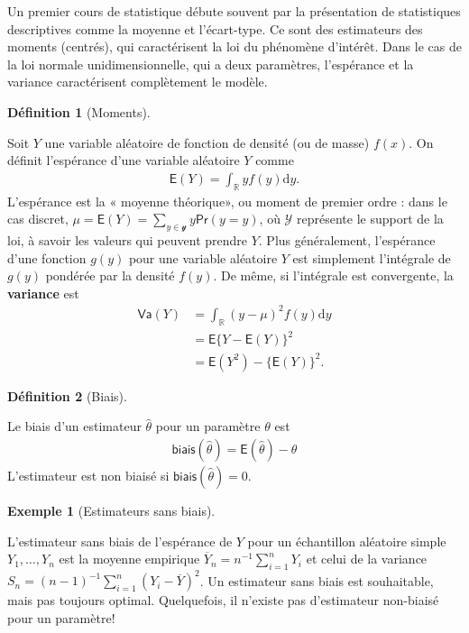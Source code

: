 \documentclass[
  11pt,
  letterpaper,
]{scrbook}
\theoremstyle{definition}
\newtheorem{example}{Exemple}[chapter]
\theoremstyle{definition}
\newtheorem{definition}{Définition}[chapter]
\theoremstyle{remark}
\begin{document}
Un premier cours de statistique débute souvent par la présentation de
statistiques descriptives comme la moyenne et l'écart-type. Ce sont des
estimateurs des moments (centrés), qui caractérisent la loi du phénomène
d'intérêt. Dans le cas de la loi normale unidimensionnelle, qui a deux
paramètres, l'espérance et la variance caractérisent complètement le
modèle.

\begin{definition}[Moments]\protect\hypertarget{def-moments}{}\label{def-moments}

Soit \(Y\) une variable aléatoire de fonction de densité (ou de masse)
\(f(x)\). On définit l'espérance d'une variable aléatoire \(Y\) comme
\begin{align*}
\mathsf{E}(Y)=\int_{\mathbb{R}} y f(y) \mathrm{d} y.
\end{align*} L'espérance est la « moyenne théorique», ou moment de
premier ordre : dans le cas discret,
\(\mu = \mathsf{E}(Y)=\sum_{y \in \mathcal{y}} y \mathsf{Pr}(y=y)\), où
\(\mathcal{Y}\) représente le support de la loi, à savoir les valeurs
qui peuvent prendre \(Y\). Plus généralement, l'espérance d'une fonction
\(g(y)\) pour une variable aléatoire \(Y\) est simplement l'intégrale de
\(g(y)\) pondérée par la densité \(f(y)\). De même, si l'intégrale est
convergente, la \textbf{variance} est \begin{align*}
\mathsf{Va}(Y)&=\int_{\mathbb{R}} (y-\mu)^2 f(y) \mathrm{d} y \\&=\mathsf{E}\{Y-\mathsf{E}(Y)\}^2 \\&= \mathsf{E}(Y^2) - \{\mathsf{E}(Y)\}^2.
\end{align*}

\end{definition}

\begin{definition}[Biais]\protect\hypertarget{def-biais}{}\label{def-biais}

Le biais d'un estimateur \(\hat{\theta}\) pour un paramètre \(\theta\)
est \begin{align*}
\mathsf{biais}(\hat{\theta})=\mathsf{E}(\hat{\theta})- \theta
\end{align*} L'estimateur est non biaisé si
\(\mathsf{biais}(\hat{\theta})=0\).

\end{definition}

\begin{example}[Estimateurs sans
biais]\protect\hypertarget{exm-estimateurs-non-biaises}{}\label{exm-estimateurs-non-biaises}

L'estimateur sans biais de l'espérance de \(Y\) pour un échantillon
aléatoire simple \(Y_1, \ldots, Y_n\) est la moyenne empirique
\(\overline{Y}_n = n^{-1} \sum_{i=1}^n Y_i\) et celui de la variance
\(S_n = (n-1)^{-1} \sum_{i=1}^n (Y_i-\overline{Y})^2\). Un estimateur
sans biais est souhaitable, mais pas toujours optimal. Quelquefois, il
n'existe pas d'estimateur non-biaisé pour un paramètre!

\end{example}
\end{document}
